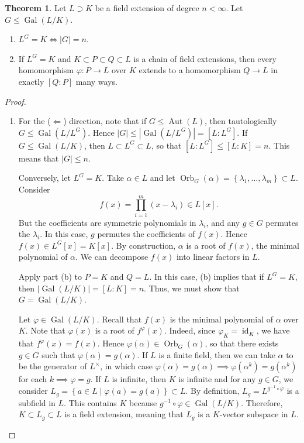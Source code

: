 \documentclass[10pt,letterpaper,cm]{nupset}
\theoremstyle{definition}
\theoremstyle{theorem}
\newtheorem{theorem}[definition]{Theorem}
\theoremstyle{remark}
\newcommand{\1}{\mathbf{1}}
\newcommand{\0}{\vec 0}
\DeclareMathOperator{\id}{id}
\DeclareMathOperator{\gal}{Gal}
\DeclareMathOperator{\aut}{Aut}
\DeclareMathOperator{\orb}{Orb}
\begin{document}
\begin{theorem}
Let $L \supset K$ be a field extension of degree $n<\infty$. Let $G \leq  \gal(L/K)$.
\begin{enumerate}[label=(\alph*)]
\item $L^G = K \iff \left\lvert{G}\right\rvert = n$.
\item  If $L^G = K$ and $K \subset P \subset Q \subset L$ is a chain of field extensions, then every homomorphism $\varphi : P \to L$ over $K$ extends to a homomorphism $Q \to L$ in exactly $[Q:P]$ many ways. 
\end{enumerate}
\end{theorem}
\begin{proof} $ $
\begin{enumerate}[label=(\alph*)]
\item For the ($\Longleftarrow$) direction, note that if $G \leq \aut(L)$, then tautologically $G \leq \gal(L/L^G)$. Hence $\left\lvert{G}\right\rvert \leq \left\lvert{\gal(L/L^G)}\right\rvert = \left[L: L^G\right]$. If $G \leq \gal(L/K)$, then $L \subset L^G \subset L$, so that $\left[L:L^G\right]\leq [L:K] =n$. This means that $\left\lvert{G}\right\rvert\leq n$.

Conversely, let $L^G =K$.  Take $\alpha \in L$ and let $\orb_G(\alpha) = \left\{\lambda_1, \ldots, \lambda_m\right\} \subset L$. Consider $$f(x) = \prod_{i=1}^m (x-\lambda_i) \in L[x].$$ But the coefficients are symmetric polynomials in $\lambda_i$, and any $g\in G$ permutes the $\lambda_i$. In this case, $g$ permutes the coefficients of $f(x)$. Hence $f(x) \in L^G[x] = K[x]$. By construction, $\alpha$ is a root of $f(x)$, the minimal polynomial of $\alpha$.  We can decompose $f(x)$ into linear factors in $L$.

Apply part (b) to $P = K$ and $Q=L$. In this case, (b) implies that if $L^G=K$, then $\left\lvert{\gal(L/K)}\right\rvert = [L:K]=n$. Thus, we must show that $G = \gal(L/K)$.

Let $\varphi \in \gal(L/K)$. Recall that $f(x)$ is the minimal polynomial of $\alpha$ over $K$. Note that $\varphi(x)$ is a root of $f^{\varphi}(x)$. Indeed, since $\varphi_K = \id_K$, we have that $f^{\varphi}(x) = f(x)$. Hence $\varphi(\alpha) \in \orb_G(\alpha)$, so that there exists $g\in G$ such that $\varphi(\alpha) = g(\alpha)$. If $L$ is a finite field, then we can take $\alpha$ to be the generator of $L^{\times}$, in which case $\varphi(\alpha) = g(\alpha) \implies \varphi(\alpha^k)= g(\alpha^k)$ for each $k \implies \varphi = g.$ If $L$ is infinite, then $K$ is infinite and for any $g\in G$, we consider $L_g = \left\{a\in L \mid \varphi(a) = g(a)\right\}\subset L$. By definition, $L_g = L^{g^{-1}\circ \varphi}$ is a subfield in $L$. This contains $K$ because $g^{-1}\circ \varphi \in \gal(L/K)$. Therefore, $K\subset L_g \subset L$ is a field extension, meaning that $L_g$ is a $K$-vector subspace in $L$.


\end{enumerate}
\end{proof}
\end{document}
